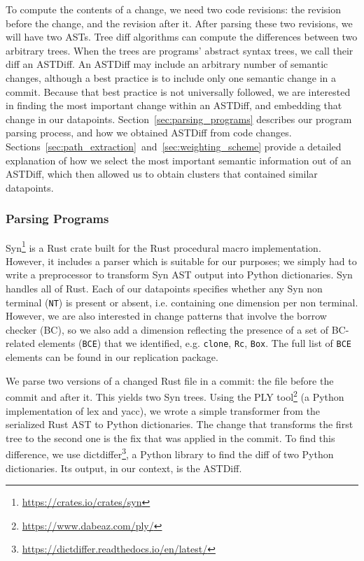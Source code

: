 To compute the contents of a change, we need two code revisions: the revision before the change, and the revision after it. After parsing these two revisions, we will have two ASTs. Tree diff algorithms can compute the differences between two arbitrary trees. When the trees are programs' abstract syntax trees, we call their diff an ASTDiff. An ASTDiff may include an arbitrary number of semantic changes, although a best practice is to include only one semantic change in a commit. Because that best practice is not universally followed, we are interested in finding the most important change within an ASTDiff, and embedding that change in our datapoints. Section~\ref{sec:parsing_programs} describes our program parsing process, and how we obtained ASTDiff from code changes. Sections~\ref{sec:path_extraction}~and~\ref{sec:weighting_scheme} provide a detailed explanation of how we select the most important semantic information out of an ASTDiff, which then allowed us to obtain clusters that contained similar datapoints. 

\subsubsection{\label{sec:parsing_programs}Parsing Programs}

Syn\footnote{\url{https://crates.io/crates/syn}} is a Rust crate built for the Rust procedural macro implementation. However, it includes a parser which is suitable for our purposes; we simply had to write a preprocessor to transform Syn AST output into Python dictionaries. Syn handles all of Rust. Each of our datapoints specifies whether any Syn non terminal (\texttt{NT}) is present or absent, i.e. containing one dimension per non terminal. However, we are also interested in change patterns that involve the borrow checker (BC), so we also add a dimension reflecting the presence of a set of BC-related elements (\texttt{BCE}) that we identified, e.g. \texttt{clone}, \texttt{Rc}, \texttt{Box}. The full list of \texttt{BCE} elements can be found in our replication package.

We parse two versions of a changed Rust file in a commit: the file before the commit and after it. This yields two Syn trees. Using the PLY tool\footnote{\url{https://www.dabeaz.com/ply/}} (a Python implementation of lex and yacc), we wrote a simple transformer from the serialized Rust AST to Python dictionaries. The change that transforms the first tree to the second one is the fix that was applied in the commit. To find this difference, we use dictdiffer\footnote{\url{https://dictdiffer.readthedocs.io/en/latest/}}, a Python library to find the diff of two Python dictionaries. Its output, in our context, is the ASTDiff.

